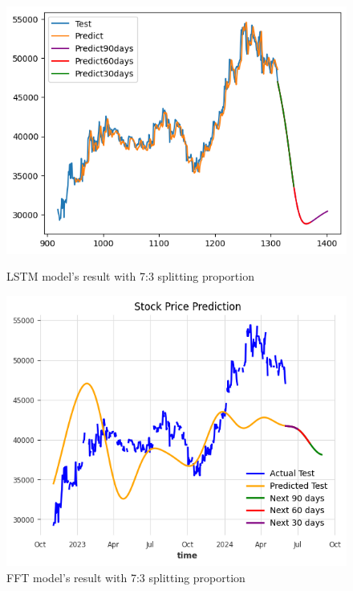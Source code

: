 \documentclass{ieeeojies}
\begin{document}
\begin{figure}[H]
    \centering
    \begin{minipage}{0.45\linewidth}
        \centering
        \includegraphics[width=\linewidth]{bibliography/diagram/LSTM-BID.png}
        \caption{LSTM model’s result with 7:3 splitting proportion}
        \label{fig:LSTM-BID}
    \end{minipage}
    \hfill
    \begin{minipage}{0.45\linewidth}
        \centering
        \includegraphics[width=\linewidth]{bibliography/diagram/FFT-BID.png}
        \caption{FFT model’s result with 7:3 splitting proportion}
        \label{fig:FFT-BID}
    \end{minipage}
\end{figure}
\end{document}
